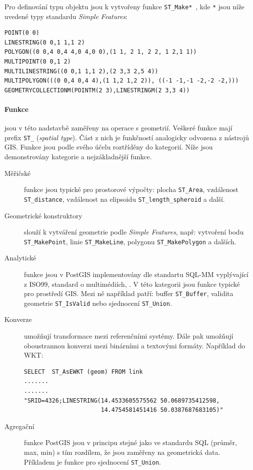 \documentclass[a4paper,12pt,oneside]{report}
\begin{document}
Pro definování typu objektu jsou k vytvořeny funkce \texttt{ST\_Make*
}, kde \texttt{*} jsou níže uvedené typy standardu \textit{Simple
  Features}:


\begin{verbatim}
POINT(0 0)                                               
LINESTRING(0 0,1 1,1 2)                                       
POLYGON((0 0,4 0,4 4,0 4,0 0),(1 1, 2 1, 2 2, 1 2,1 1))          
MULTIPOINT(0 0,1 2)                                              
MULTILINESTRING((0 0,1 1,1 2),(2 3,3 2,5 4))                       
MULTIPOLYGON(((0 0,4 0,4 4),(1 1,2 1,2 2)), ((-1 -1,-1 -2,-2 -2,))) 
GEOMETRYCOLLECTIONM(POINTM(2 3),LINESTRINGM(2 3,3 4))                
\end{verbatim}

\paragraph*{Funkce} jsou v této nadstavbě zaměřeny na operace s
geometrií. Veškeré funkce mají prefix \texttt{ST\_} (\textit{spatial
  type}). Část z nich je funkčností analogicky odvozena z nástrojů
GIS. Funkce jsou podle svého účelu roztříděny do kategorií. Níže jsou
demonstrovány kategorie a nejzákladnější funkce.
\begin{description}
\item[Měřičské] funkce jsou typické pro prostorové výpočty: plocha
  \texttt{ST\_Area}, vzdálenost \texttt{ST\_distance}, vzdálenost na
  elipsoidu \texttt{ST\_length\_spheroid} a další.

\item[Geometrické konstruktory] slouží k vytváření geometrie podle
  \textit{Simple Features}, např: vytvoření bodu \texttt{ST\_MakePoint},
  linie \texttt{ST\_MakeLine}, polygonu \texttt{ST\_MakePolygon} a
  dalších.

\item[Analytické] funkce jsou v PostGIS implementovány dle standartu
  SQL-MM vyplývající z ISO99, standard o multimédiích, 
  \cite{sqlmm}. V této kategorii jsou funkce typické pro prostředí
  GIS. Mezi ně například patří: buffer \texttt{ST\_Buffer}, validita
  geometrie \texttt{ST\_IsValid} nebo sjednocení \texttt{ST\_Union}.

\item[Konverze] umožňují transformace mezi referenčními systémy. Dále
  pak umožňují oboustrannou konverzi mezi binárními a textovými
  formáty. Například do  \acs{WKT}:

\begin{verbatim}
SELECT  ST_AsEWKT (geom) FROM link
.......
.......
"SRID=4326;LINESTRING(14.4533605575562 50.0689735412598,
                      14.4754581451416 50.0387687683105)"
\end{verbatim}

\item[Agregační] funkce PostGIS jsou v principu stejné jako ve
  standardu SQL (průměr, max, min) s tím rozdílem, že jsou zaměřeny na
  geometrická data. Příkladem je funkce pro sjednocení
  \texttt{ST\_Union}.
\end{description}
\end{document}

